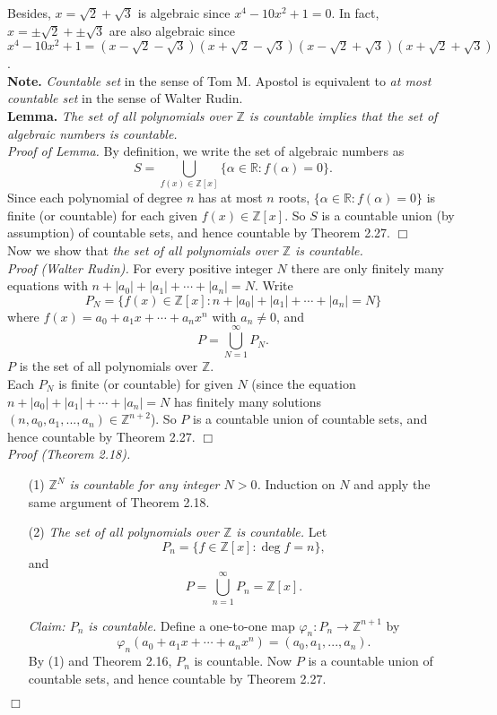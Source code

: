 \documentclass{article}
\begin{document}
Besides, $x = \sqrt{2} + \sqrt{3}$ is algebraic since $x^4 - 10x^2 + 1 = 0$.
In fact, $x = \pm\sqrt{2} + \pm\sqrt{3}$ are also algebraic since
$x^4 - 10x^2 + 1 =
(x - \sqrt{2} - \sqrt{3})(x + \sqrt{2} - \sqrt{3})
(x - \sqrt{2} + \sqrt{3})(x + \sqrt{2} + \sqrt{3})$. \\

\textbf{Note.} \emph{Countable set} in the sense of Tom M. Apostol
is equivalent to \emph{at most countable set} in the sense of Walter Rudin. \\

\textbf{Lemma.}
\emph{The set of all polynomials over $\mathbb{Z}$ is countable implies that
the set of algebraic numbers is countable.} \\

\emph{Proof of Lemma.}
By definition, we write the set of algebraic numbers as
$$S = \bigcup_{f(x) \in \mathbb{Z}[x]} \{ \alpha \in \mathbb{R} : f(\alpha) = 0 \}.$$
Since each polynomial of degree $n$ has at most $n$ roots,
$\{ \alpha \in \mathbb{R} : f(\alpha) = 0 \}$ is finite (or countable)
for each given $f(x) \in \mathbb{Z}[x]$.
So $S$ is a countable union (by assumption) of countable sets, and hence countable
by Theorem 2.27.
$\Box$ \\

Now we show that
\emph{the set of all polynomials over $\mathbb{Z}$ is countable.} \\

\emph{Proof (Walter Rudin).}
For every positive integer $N$ there are only finitely many equations with
$n + |a_0| + |a_1| + \cdots + |a_n| = N.$
Write
$$P_N = \{ f(x) \in \mathbb{Z}[x] : n + |a_0| + |a_1| + \cdots + |a_n| = N \}$$
where $f(x) = a_0 + a_1 x + \cdots + a_n x^n$ with $a_n \neq 0$,
and
$$P = \bigcup_{N = 1}^{\infty} P_N.$$
$P$ is the set of all polynomials over $\mathbb{Z}$. \\

Each $P_N$ is finite (or countable) for given $N$
(since the equation $n + |a_0| + |a_1| + \cdots + |a_n| = N$
has finitely many solutions
$(n, a_0, a_1, ..., a_n) \in \mathbb{Z}^{n+2}$).
So $P$ is a countable union of countable sets, and hence countable
by Theorem 2.27.
$\Box$ \\

\emph{Proof (Theorem 2.18).}
\begin{enumerate}
\item[(1)]
\emph{$\mathbb{Z}^N$ is countable for any integer $N > 0$.}
Induction on $N$ and apply the same argument of Theorem 2.18.
\item[(2)]
\emph{The set of all polynomials over $\mathbb{Z}$ is countable.}
Let
$$P_n = \{ f \in \mathbb{Z}[x] : \deg f = n \},$$
and
$$P = \bigcup_{n = 1}^{\infty} P_n = \mathbb{Z}[x].$$

\emph{Claim: $P_n$ is countable.}
Define a one-to-one map $\varphi_n: P_n \rightarrow \mathbb{Z}^{n+1}$ by
$$\varphi_n(a_0 + a_1 x + \cdots + a_n x^n)
= (a_0, a_1, ..., a_n).$$
By (1) and Theorem 2.16, $P_n$ is countable.
Now $P$ is a countable union of countable sets,
and hence countable by Theorem 2.27.
\end{enumerate}
$\Box$ \\
\end{document}
